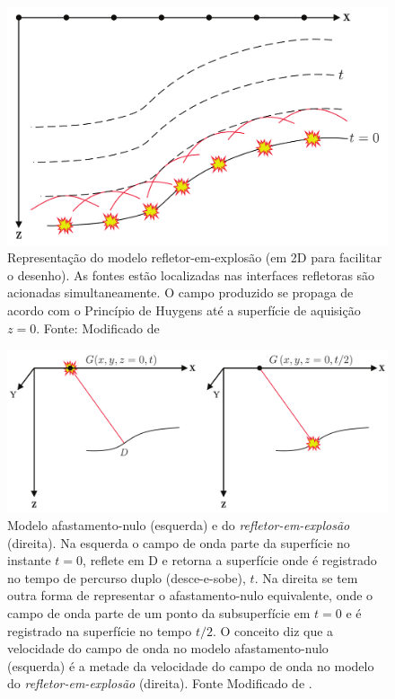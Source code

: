 \begin{figure}[H]
\centering
\includegraphics[totalheight=7.0cm]{figuras/cap3/refletor-em-explosao.pdf}
\caption{Representação do modelo refletor-em-explosão (em 2D para facilitar o desenho). 
As fontes estão localizadas nas interfaces refletoras são acionadas simultaneamente. 
O campo produzido se propaga de acordo com o Princípio de Huygens até a superfície de aquisição $z=0$. Fonte: Modificado de \citep{Schneider(1978)}}
\label{fig:refletor-em-explosao}
\end{figure}

\begin{figure}[H]
\centering
\includegraphics[totalheight=6.0cm]{figuras/cap3/refletor-em-explosao3.pdf}
\caption{Modelo afastamento-nulo (esquerda) e do \textit{refletor-em-explosão} (direita). 
Na esquerda o campo de onda parte da superfície no instante $t=0$, reflete em D e retorna a superfície onde é registrado no tempo de percurso duplo (desce-e-sobe), $t$. 
Na direita se tem outra forma de representar o afastamento-nulo equivalente, onde o campo de onda parte de um ponto da subsuperfície em $t=0$ e é registrado na superfície no tempo $t/2$. 
O conceito diz que a velocidade do campo de onda no modelo afastamento-nulo (esquerda) é a metade da velocidade do campo de onda no modelo do \textit{refletor-em-explosão} (direita). 
Fonte Modificado de \citep{Schneider(1978)}.}
\label{fig:refletor-em-explosao2}
\end{figure}

